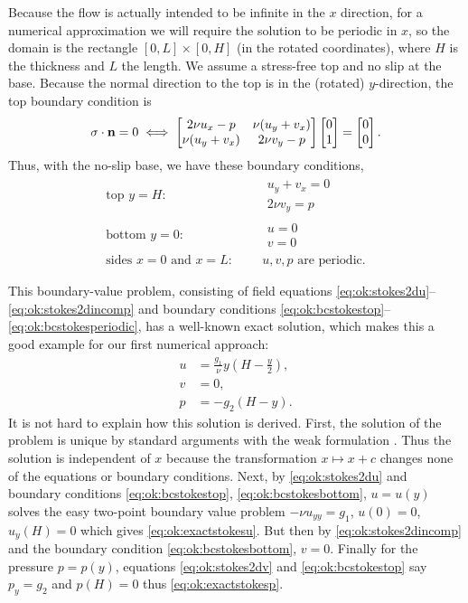 Because the flow is actually intended to be infinite in the $x$ direction, for a numerical approximation we will require the solution to be periodic in $x$, so the domain is the rectangle $[0,L]\times[0,H]$ (in the rotated coordinates), where $H$ is the thickness and $L$ the length.  We assume a stress-free top and no slip at the base.  Because the normal direction to the top is in the (rotated) $y$-direction, the top boundary condition is
  $$\sigma\cdot\mathbf{n} = 0 \iff
\begin{bmatrix}
2 \nu u_x - p & \nu (u_y+v_x) \\
\nu (u_y+v_x) & 2 \nu v_y - p
\end{bmatrix} \begin{bmatrix}
0 \\ 1
\end{bmatrix} = \begin{bmatrix}
0 \\ 0
\end{bmatrix}.$$
Thus, with the no-slip base, we have these boundary conditions,
\begin{align}
\text{top $y=H$:}&    & &\begin{array}{l} u_y + v_x = 0 \\ 2 \nu v_y = p\end{array}  \label{eq:ok:bcstokestop} \\
\text{bottom $y=0$:}& & &\begin{array}{l} u = 0 \\ v = 0 \end{array} \label{eq:ok:bcstokesbottom} \\
\text{sides $x=0$ and $x=L$:}&
                      & &u,v,p \text{ are periodic}. \label{eq:ok:bcstokesperiodic}
\end{align}

This boundary-value problem, consisting of field equations \eqref{eq:ok:stokes2du}--\eqref{eq:ok:stokes2dincomp} and boundary conditions \eqref{eq:ok:bcstokestop}--\eqref{eq:ok:bcstokesperiodic}, has a well-known exact solution, which makes this a good example for our first numerical approach:
\begin{align}
u &= \frac{g_1}{\nu} y \left(H - \frac{y}{2}\right), \label{eq:ok:exactstokesu} \\
v &= 0, \label{eq:ok:exactstokesv} \\
p &= -g_2 (H-y).\label{eq:ok:exactstokesp}
\end{align}
It is not hard to explain how this solution is derived.  First, the solution of the problem is unique by standard arguments with the weak formulation \citep[p.~223]{Elmanetal2005}.  Thus the solution is independent of $x$ because the transformation $x\mapsto x+c$ changes none of the equations or boundary conditions.  Next, by \eqref{eq:ok:stokes2du} and boundary conditions \eqref{eq:ok:bcstokestop}, \eqref{eq:ok:bcstokesbottom}, $u=u(y)$ solves the easy two-point boundary value problem $-\nu u_{yy} = g_1$, $u(0)=0$, $u_y(H)=0$ which gives \eqref{eq:ok:exactstokesu}.  But then by \eqref{eq:ok:stokes2dincomp} and the boundary condition \eqref{eq:ok:bcstokesbottom}, $v=0$.  Finally for the pressure $p=p(y)$, equations \eqref{eq:ok:stokes2dv} and \eqref{eq:ok:bcstokestop} say $p_y=g_2$ and $p(H)=0$ thus \eqref{eq:ok:exactstokesp}.


